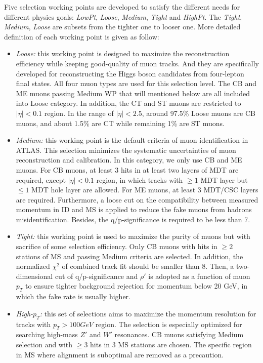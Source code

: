 Five selection working points are developed to satisfy the different needs for different physics goals: \textit{LowPt}, \textit{Loose}, \textit{Medium}, \textit{Tight} and \textit{HighPt}.
The \textit{Tight}, \textit{Medium}, \textit{Loose} are subsets from the tighter one to looser one.
More detailed definition of each working point is given as follow:
\begin{itemize}
	\item \textit{Loose:} this working point is designed to maximize the reconstruction efficiency while keeping good-quality of muon tracks. And they are specifically developed for reconstructing the Higgs boson candidates from four-lepton final states. All four muon types are used for this selection level. The CB and ME muons passing Medium WP that will mentioned below are all included into Loose category. In addition, the CT and ST muons are restricted to $|\eta| < 0.1$ region.
In the range of $|\eta| < 2.5$, around 97.5\% Loose muons are CB muons, and about 1.5\% are CT while remaining 1\% are ST muons.
	\item \textit{Medium:} this working point is the default criteria of muon identification in ATLAS. This selection minimizes the systematic uncertainties of muon reconstruction and calibration. In this category, we only use CB and ME muons. For CB muons, at least 3 hits in at least two layers of MDT are required, except $|\eta| < 0.1$ region, in which tracks with $\geq 1$ MDT layer but $\leq 1$ MDT hole layer are allowed. For ME muons, at least 3 MDT/CSC layers are required.
Furthermore, a loose cut on the compatibility between measured momentum in ID and MS is applied to reduce the fake muons from hadrons misidentification. Besides, the q/p-significance is required to be less than 7.
	\item \textit{Tight:} this working point is used to maximize the purity of muons but with sacrifice of some selection efficiency. Only CB muons with hits in $\geq 2$ stations of MS and passing Medium criteria are selected.
In addition, the normalized $\chi^{2}$ of combined track fit should be smaller than 8. Then, a two-dimensional cut of q/p-significance and $\rho'$ is adopted as a function of muon $p_{T}$ to ensure tighter background rejection for momentum below 20 GeV, in which the fake rate is usually higher.
	\item \textit{High-$p_{T}$:} this set of selections aims to maximize the momentum resolution for tracks with $p_{T} > 100 GeV$ region. The selection is especially optimized for searching high-mass $Z'$ and $W'$ resonances. CB muons satisfying Medium selection and with $\geq 3$ hits in 3 MS stations are chosen. The specific region in MS where alignment is suboptimal are removed as a precaution.

\end{itemize}
